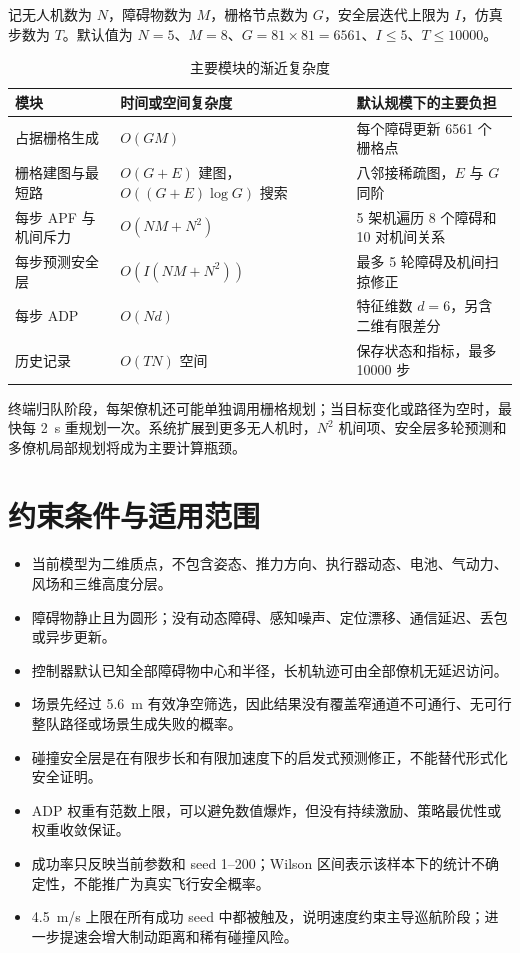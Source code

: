 \documentclass[UTF8,a4paper,12pt,fontset=windows]{ctexart}
\begin{document}
记无人机数为 $N$，障碍物数为 $M$，栅格节点数为 $G$，安全层迭代上限为 $I$，仿真步数为 $T$。默认值为 $N=5$、$M=8$、$G=81\times81=6561$、$I\leq5$、$T\leq10000$。

\begin{table}[H]
\centering
\caption{主要模块的渐近复杂度}
\label{tab:complexity}
\small
\begin{tabularx}{\textwidth}{@{}lC{4.5cm}Y@{}}
\toprule
模块 & 时间或空间复杂度 & 默认规模下的主要负担 \\
\midrule
占据栅格生成 & $O(GM)$ & 每个障碍更新 6561 个栅格点 \\
栅格建图与最短路 & $O(G+E)$ 建图，$O((G+E)\log G)$ 搜索 & 八邻接稀疏图，$E$ 与 $G$ 同阶 \\
每步 APF 与机间斥力 & $O(NM+N^2)$ & 5 架机遍历 8 个障碍和 10 对机间关系 \\
每步预测安全层 & $O(I(NM+N^2))$ & 最多 5 轮障碍及机间扫掠修正 \\
每步 ADP & $O(Nd)$ & 特征维数 $d=6$，另含二维有限差分 \\
历史记录 & $O(TN)$ 空间 & 保存状态和指标，最多 10000 步 \\
\bottomrule
\end{tabularx}
\end{table}

终端归队阶段，每架僚机还可能单独调用栅格规划；当目标变化或路径为空时，最快每 \SI{2}{s} 重规划一次。系统扩展到更多无人机时，$N^2$ 机间项、安全层多轮预测和多僚机局部规划将成为主要计算瓶颈。

\section{约束条件与适用范围}

\begin{itemize}
  \item 当前模型为二维质点，不包含姿态、推力方向、执行器动态、电池、气动力、风场和三维高度分层。
  \item 障碍物静止且为圆形；没有动态障碍、感知噪声、定位漂移、通信延迟、丢包或异步更新。
  \item 控制器默认已知全部障碍物中心和半径，长机轨迹可由全部僚机无延迟访问。
  \item 场景先经过 \SI{5.6}{m} 有效净空筛选，因此结果没有覆盖窄通道不可通行、无可行整队路径或场景生成失败的概率。
  \item 碰撞安全层是在有限步长和有限加速度下的启发式预测修正，不能替代形式化安全证明。
  \item ADP 权重有范数上限，可以避免数值爆炸，但没有持续激励、策略最优性或权重收敛保证。
  \item 成功率只反映当前参数和 seed 1--200；Wilson 区间表示该样本下的统计不确定性，不能推广为真实飞行安全概率。
  \item \SI{4.5}{m/s} 上限在所有成功 seed 中都被触及，说明速度约束主导巡航阶段；进一步提速会增大制动距离和稀有碰撞风险。
\end{itemize}
\end{document}
